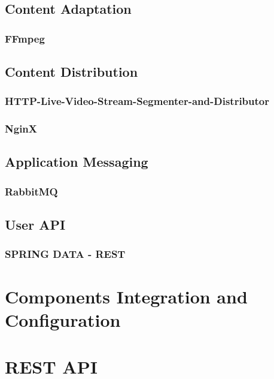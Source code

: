 	\subsection{Content Adaptation\label{sec:des_ar_ov}}	
	\subsubsection{FFmpeg\label{sec:impl_ff}}
	
	\subsection{Content Distribution\label{sec:des_cdn}}
	\subsubsection{HTTP-Live-Video-Stream-Segmenter-and-Distributor\label{sec:impl_http_li}}
	\subsubsection{NginX\label{sec:impl_ngi}}
	
	\subsection{Application Messaging\label{sec:des_me}}
	\subsubsection{RabbitMQ\label{sec:impl_ra_mq}}
	
	\subsection{User API\label{sec:des_api}}
	\subsubsection{SPRING DATA - REST\label{sec:des_api}}

\section{Components Integration and Configuration\label{sec:impl_comp_in}}

\section{REST API\label{sec:impl_rest_api}}
